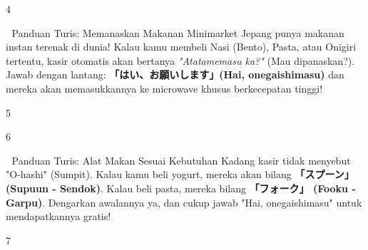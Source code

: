 \begin{convobox}{4}
    \noindent
     

    \vspace{1.5em}
\end{convobox}

\begin{lessonbox}{🍱 Panduan Turis: Memanaskan Makanan}
    Minimarket Jepang punya makanan instan terenak di dunia! Kalau kamu membeli Nasi (Bento), Pasta, atau Onigiri tertentu, kasir otomatis akan bertanya \textit{"Atatamemasu ka?"} (Mau dipanaskan?). \\
    
    Jawab dengan lantang: \textbf{「はい、お願いします」(Hai, onegaishimasu)} dan mereka akan memasukkannya ke microwave khusus berkecepatan tinggi!
\end{lessonbox}

\begin{convobox}{5}
    \noindent
      

    \vspace{1.5em}
\end{convobox}

\begin{convobox}{6}
    \noindent
     

    \vspace{1.5em}
\end{convobox}

\begin{lessonbox}{🥢 Panduan Turis: Alat Makan Sesuai Kebutuhan}
    Kadang kasir tidak menyebut "O-hashi" (Sumpit). Kalau kamu beli yogurt, mereka akan bilang \textbf{「スプーン」 (Supuun - Sendok)}. Kalau beli pasta, mereka bilang \textbf{「フォーク」 (Fooku - Garpu)}. Dengarkan awalannya ya, dan cukup jawab "Hai, onegaishimasu" untuk mendapatkannya gratis!
\end{lessonbox}

\begin{convobox}{7}
    \noindent
     

    \vspace{1.5em}
\end{convobox}

